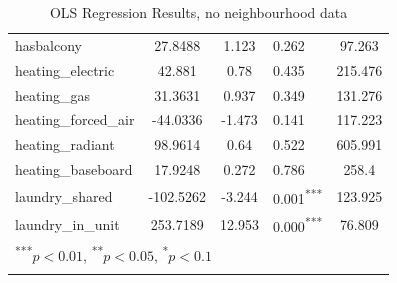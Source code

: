 \documentclass[12pt]{report}
\begin{document}
\begin{longtable}{l S[table-format=6.4] S[table-format=3.4] l S[table-format=4.4]}
	hasbalcony                   & 27.8488              & 1.123            & 0.262                      & 97.263                            \\
	heating\_electric            & 42.881               & 0.78             & 0.435                      & 215.476                           \\
	heating\_gas                 & 31.3631              & 0.937            & 0.349                      & 131.276                           \\
	heating\_forced\_air         & -44.0336             & -1.473           & 0.141                      & 117.223                           \\
	heating\_radiant             & 98.9614              & 0.64             & 0.522                      & 605.991                           \\
	heating\_baseboard           & 17.9248              & 0.272            & 0.786                      & 258.4                             \\
	laundry\_shared              & -102.5262            & -3.244           & 0.001\textsuperscript{***} & 123.925                           \\
	laundry\_in\_unit            & 253.7189             & 12.953           & 0.000\textsuperscript{***} & 76.809                            \\
    \bottomrule
	                             \\
	\caption{OLS Regression Results, no neighbourhood data}\label{table:ols_with_neighbourhood}
\end{longtable}
\end{document}
